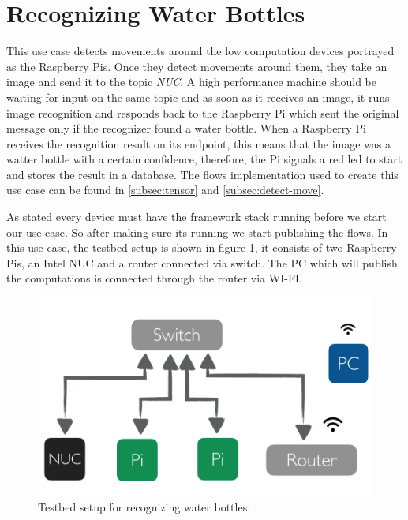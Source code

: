 \section{Recognizing Water Bottles }
This use case detects movements around the low computation devices portrayed as the Raspberry Pis. Once they detect movements around them, they take an image and send it to the topic \textit{NUC}. A high performance machine should be waiting for input on the same topic and as soon as it receives an image, it runs image recognition and responds back to the Raspberry Pi which sent the original message  only if the recognizer found a water bottle. When a Raspberry Pi receives the recognition result on its endpoint, this means that the image was a watter bottle with a certain confidence, therefore, the Pi signals a red led to start and stores the result in a database. The flows implementation used to create this use case can be found in \ref{subsec:tensor} and \ref{subsec:detect-move}. 

\noindent As stated every device must have the framework stack running before we start our use case. So after making sure its running we start publishing the flows. In this use case, the testbed setup is shown in figure \ref{fig:tb-tensor}, it consists of two Raspberry Pis, an Intel NUC and a router connected via switch. The PC which will publish the computations is connected through the router via WI-FI. 
 \begin{figure}[H]
	\centering
	\includegraphics[scale=0.6]{images/tb-tensor.png}
	\caption{Testbed setup for recognizing water bottles.}
	\label{fig:tb-tensor}
\end{figure} 

